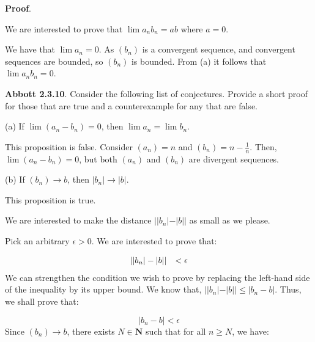 \documentclass[10pt]{article}
\begin{document}
\textbf{Proof}.



We are interested to prove that $\displaystyle \lim a_{n} b_{n} =ab$ where $\displaystyle a=0$. 



We have that $\displaystyle \lim a_{n} =0$. As $\displaystyle ( b_{n})$ is a convergent sequence, and convergent sequences are bounded, so $\displaystyle ( b_{n})$ is bounded. From (a) it follows that $\displaystyle \lim a_{n} b_{n} =0$.



\textbf{Abbott 2.3.10}. Consider the following list of conjectures. Provide a short proof for those that are true and a counterexample for any that are false.



(a) If $\displaystyle \lim ( a_{n} -b_{n}) =0$, then $\displaystyle \lim a_{n} =\lim b_{n}$.



This proposition is false. Consider $\displaystyle ( a_{n}) =n$ and $\displaystyle ( b_{n}) =n-\frac{1}{n}$. Then, $\displaystyle \lim ( a_{n} -b_{n}) =0$, but both $\displaystyle ( a_{n})$ and $\displaystyle ( b_{n})$ are divergent sequences.



(b) If $\displaystyle ( b_{n})\rightarrow b$, then $\displaystyle |b_{n} |\rightarrow |b|$. 



This proposition is true. 



We are interested to make the distance $\displaystyle ||b_{n} |-|b||$ as small as we please.



Pick an arbitrary $\displaystyle \epsilon  >0$. We are interested to prove that:


\begin{equation*}
\begin{array}{ c c }
||b_{n} |-|b|| & < \epsilon 
\end{array}
\end{equation*}
We can strengthen the condition we wish to prove by replacing the left-hand side of the inequality by its upper bound. We know that, $\displaystyle ||b_{n} |-|b||\leq |b_{n} -b|$. Thus, we shall prove that:


\begin{equation*}
|b_{n} -b|< \epsilon 
\end{equation*}
Since $\displaystyle ( b_{n})\rightarrow b$, there exists $\displaystyle N\in \mathbf{N}$ such that for all $\displaystyle n\geq N$, we have:
\end{document}
